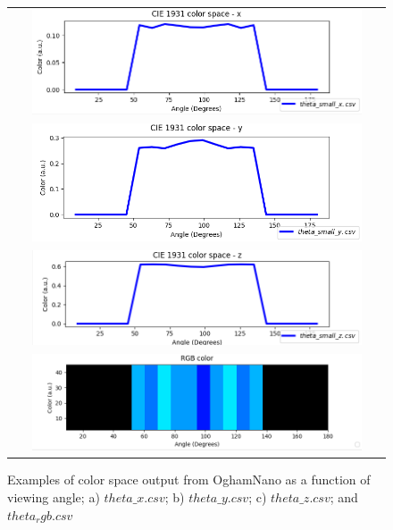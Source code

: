 \begin{figure}[H]
\centering
\begin{tabular}{ c }

\includegraphics[width=0.9\textwidth,height=0.25\textwidth]{./images/oled/cie_x.png}

\\
\includegraphics[width=0.9\textwidth,height=0.25\textwidth]{./images/oled/cie_y.png}

\\

\includegraphics[width=0.9\textwidth,height=0.25\textwidth]{./images/oled/cie_z.png}
\\

\includegraphics[width=0.9\textwidth,height=0.25\textwidth]{./images/oled/angle_vs_colors.png}
\\

\end{tabular}
\caption{Examples of color space output from OghamNano as a function of viewing angle; a) $theta\_x.csv$; b) $theta\_y.csv$; c) $theta\_z.csv$; and $theta_rgb.csv$}
\label{fig:oled8}
\end{figure}


